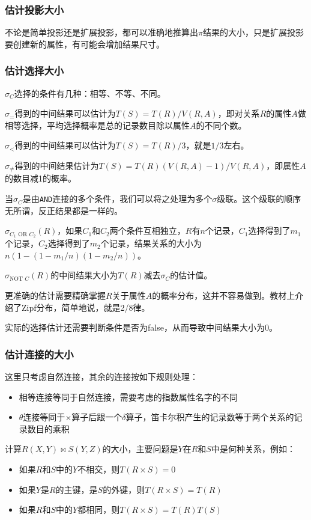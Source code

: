 \subsubsection*{估计投影大小}

不论是简单投影还是扩展投影，都可以准确地推算出$\pi$结果的大小，只是扩展投影要创建新的属性，有可能会增加结果尺寸。

\subsubsection*{估计选择大小}

$\sigma_C$选择的条件有几种：相等、不等、不同。

$\sigma_=$得到的中间结果可以估计为$T(S)=T(R)/V(R,A)$，即对关系$R$的属性$A$做相等选择，平均选择概率是总的记录数目除以属性$A$的不同个数。

$\sigma_<$得到的中间结果可以估计为$T(S)=T(R)/3$，就是$1/3$左右。

$\sigma_{\neq}$得到的中间结果估计为$T(S)=T(R)(V(R,A)-1)/V(R,A)$，即属性$A$的数目减1的概率。

当$\sigma_C$是由\texttt{AND}连接的多个条件，我们可以将之处理为多个$\sigma$级联。这个级联的顺序无所谓，反正结果都是一样的。

$\sigma_{C_1 \text{ OR } C_2}(R)$，如果$C_1$和$C_2$两个条件互相独立，$R$有$n$个记录，$C_1$选择得到了$m_1$个记录，$C_2$选择得到了$m_2$个记录，结果关系的大小为$n(1-(1-m_1/n)(1-m_2/n))$。

$\sigma_{\text{NOT } C}(R)$的中间结果大小为$T(R)$减去$\sigma_C$的估计值。

更准确的估计需要精确掌握$R$关于属性$A$的概率分布，这并不容易做到。教材上介绍了Zipf分布，简单地说，就是2/8律。

实际的选择估计还需要判断条件是否为false，从而导致中间结果大小为0。

\subsubsection*{估计连接的大小}

这里只考虑自然连接，其余的连接按如下规则处理：
\begin{itemize}
    \item 相等连接等同于自然连接，需要考虑的指数属性名字的不同
    \item $\theta$连接等同于$\times$算子后跟一个$\delta$算子，笛卡尔积产生的记录数等于两个关系的记录数目的乘积
\end{itemize}

计算$R(X,Y) \bowtie S(Y,Z)$的大小，主要问题是$Y$在$R$和$S$中是何种关系，例如：
\begin{itemize}
    \item 如果$R$和$S$中的$Y$不相交，则$T(R\times S)=0$
    \item 如果$Y$是$R$的主键，是$S$的外键，则$T(R\times S)=T(R)$
    \item 如果$R$和$S$中的$Y$都相同，则$T(R\times S)=T(R)T(S)$
\end{itemize}


